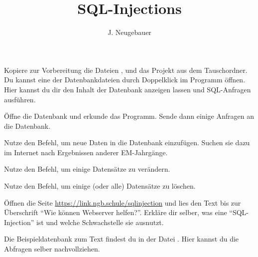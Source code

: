 \documentclass[10pt, a4paper]{scrartcl}
\author{J. Neugebauer}
\title{SQL-Injections}
\date{\Heute}
\begin{document}
\ReiheTitel

Kopiere zur Vorbereitung die Dateien ,  und das Projekt  aus dem Tauschordner. Du kannst eine der Datenbankdateien durch Doppelklick im Programm  öffnen. Hier kannst du dir den Inhalt der Datenbank anzeigen lassen und SQL-Anfragen ausführen.

\begin{aufgabe}[symbol=\symPartner\,\symLaptop]
	\begin{teilaufgaben}
		\teilaufgabe
		Öffne die Datenbank  und erkunde das Programm. Sende dann einige  Anfragen an die Datenbank.

		\teilaufgabe
		Nutze den  Befehl, um neue Daten in die Datenbank einzufügen. Suchen sie dazu im Internet nach Ergebnissen anderer EM-Jahrgänge.

		\teilaufgabe
		Nutze den  Befehl, um einige Datensätze zu verändern.

		\teilaufgabe
		Nutze den  Befehl, um einige (oder alle) Datensätze zu löschen.
	\end{teilaufgaben}


\end{aufgabe}

\begin{aufgabe}[symbol=\symPartner\,\symLaptop]
	Öffnen die Seite \url{https://link.ngb.schule/sqlinjection} und lies den Text bis zur Überschrift \enquote{Wie können Webserver helfen?}. Erkläre dir selber, was eine \enquote{SQL-Injection} ist und welche Schwachstelle sie ausnutzt.

	Die Beispieldatenbank zum Text findest du in der Datei . Hier kannst du die Abfragen selber nachvollziehen.

\end{aufgabe}
\end{document}
